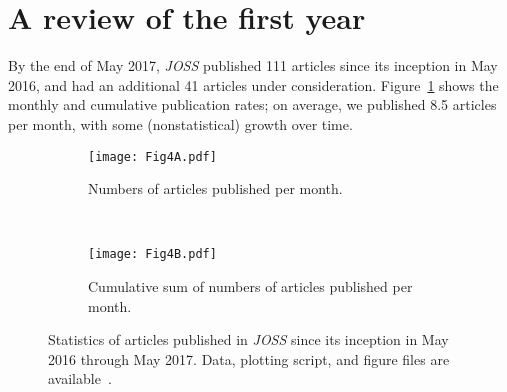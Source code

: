 \documentclass{article}
\newcommand\joss{\textit{JOSS}}
\begin{document}
\section{A review of the first year}\label{firstyear}

By the end of May 2017, \joss{} published 111 articles since its
inception in May 2016, and had an additional 41 articles under consideration.
Figure~\ref{fig:article_stats} shows the monthly and cumulative publication rates;
on average, we published 8.5 articles per month, with some (nonstatistical) growth over time.


\begin{figure}[htbp]
    \centering
    \begin{subfigure}[b]{0.7\textwidth}
        \texttt{[image: Fig4A.pdf]}
        \caption{Numbers of articles published per month.}
    \end{subfigure}
    \\
    \begin{subfigure}[b]{0.7\textwidth}
        \texttt{[image: Fig4B.pdf]}
        \caption{Cumulative sum of numbers of articles published per month.}
    \end{subfigure}
    \caption{Statistics of articles published in \joss{} since its inception in May 2016 through May 2017.
    Data, plotting script, and figure files are available~\cite{JOSS-data-figs}.}
    \label{fig:article_stats}
\end{figure}
\end{document}
